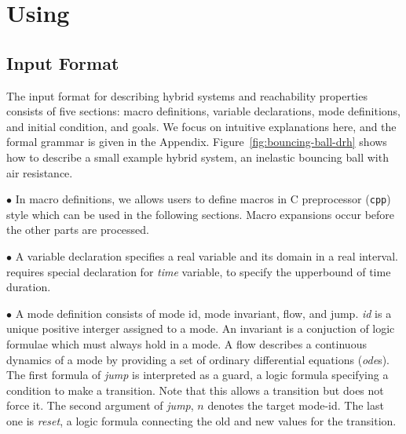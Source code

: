 \section{Using \dReach{}}\label{sec:using-dreach}
\subsection{Input Format}\label{sec:input-format}
The input format for describing hybrid systems and reachability properties consists of five
sections: macro definitions, variable declarations, mode definitions,
and initial condition, and goals. We focus on intuitive explanations here, and the formal grammar is
given in the Appendix. Figure~\ref{fig:bouncing-ball-drh} shows how to describe a small
example hybrid system, an inelastic bouncing ball with air resistance.

$\bullet$
In macro definitions, we allows users to define macros in C
preprocessor (\texttt{cpp}) style which can be used in the following
sections. Macro expansions occur before the other parts are processed.

$\bullet$
        A variable declaration specifies a real variable and its domain in a real interval.
        \dReach{} requires special declaration for \textit{time} variable, to specify the
        upperbound of time duration.

$\bullet$ A mode definition consists of mode id, mode invariant, flow, and jump.
\textit{id} is a unique positive interger assigned to a mode. An
invariant is a conjuction of logic formulae which must always hold in
a mode. A flow describes a continuous dynamics of a mode by providing
a set of ordinary differential equations (\textit{ode}s). The first
formula of \textit{jump} is interpreted as a guard, a logic formula
specifying a condition to make a transition. Note that this allows a
transition but does not force it. The second argument of
\textit{jump}, $n$ denotes the target mode-id. The last one is
\textit{reset}, a logic formula connecting the old and new values for
the transition.


